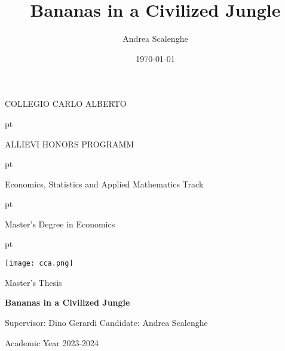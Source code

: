 
\setlength{\parindent}{0in} 
\title{Bananas in a Civilized Jungle}
\author{Andrea Scalenghe}
\date{\today}



\thispagestyle{empty}

\centerline {\Large{\textsc{COLLEGIO CARLO ALBERTO}}}
 pt

\centerline {\Large{\textsc ALLIEVI HONORS PROGRAMM}}

 pt

\centerline {{\textsc Economics, Statistics and Applied Mathematics Track}}

 pt

\centerline {\Large{\textsc Master's Degree in Economics}}
 pt





\centerline {\texttt{[image: cca.png]}}

\vskip 1.2cm

\centerline {\normalsize {Master's Thesis}} 

\vskip 0.7cm

\centerline {\Large {\bf Bananas in a Civilized Jungle} }

\vskip 1.7cm

\noindent Supervisor: Dino Gerardi
\hfill  {Candidate: Andrea Scalenghe}

\vskip 2.7cm


\centerline{Academic Year 2023-2024}
